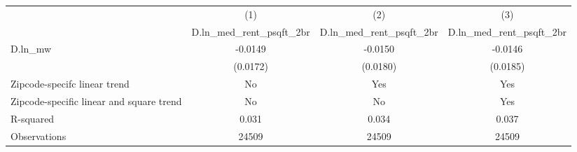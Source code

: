 {
\def\sym#1{\ifmmode^{#1}\else\(^{#1}\)\fi}
\begin{tabular}{l*{3}{c}}
\hline\hline
          &\multicolumn{1}{c}{(1)}&\multicolumn{1}{c}{(2)}&\multicolumn{1}{c}{(3)}\\
          &\multicolumn{1}{c}{D.ln\_med\_rent\_psqft\_2br}&\multicolumn{1}{c}{D.ln\_med\_rent\_psqft\_2br}&\multicolumn{1}{c}{D.ln\_med\_rent\_psqft\_2br}\\
\hline
D.ln\_mw   &  -0.0149         &  -0.0150         &  -0.0146         \\
          & (0.0172)         & (0.0180)         & (0.0185)         \\
\hline
Zipcode-specifc linear trend&       No         &      Yes         &      Yes         \\
Zipcode-specific linear and square trend&       No         &       No         &      Yes         \\
R-squared &    0.031         &    0.034         &    0.037         \\
Observations&    24509         &    24509         &    24509         \\
\hline\hline
\end{tabular}
}
